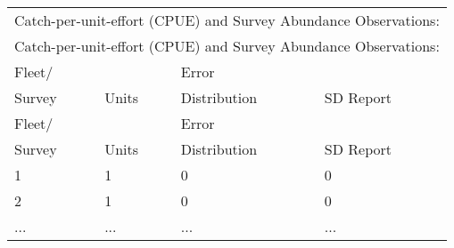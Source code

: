 \begin{center}
	\vspace*{-\baselineskip}
	\vspace*{-\baselineskip}
	\begin{tabular}{p{3cm} p{3cm} p{3cm} p{7cm}}
		\multicolumn{4}{l}{Catch-per-unit-effort (CPUE) and Survey Abundance Observations:} \\
		\multicolumn{4}{l}{Catch-per-unit-effort (CPUE) and Survey Abundance Observations:} \\
		\hline
		Fleet/ &       & Error        & \Tstrut\\
		Survey & Units & Distribution & SD Report \Bstrut\\
		Fleet/ &       & Error        & \Tstrut\\
		Survey & Units & Distribution & SD Report \Bstrut\\
		\hline
		1 & 1 & 0 & 0 \Tstrut\\
		2 & 1 & 0 & 0 \\
		... & ... & ... & ... \Bstrut\\
		\hline
	\end{tabular}		
\end{center}



